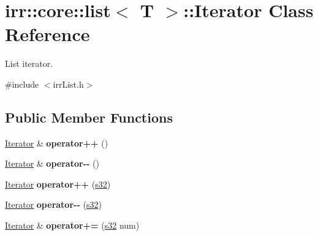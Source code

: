 \hypertarget{classirr_1_1core_1_1list_1_1Iterator}{}\section{irr\+:\+:core\+:\+:list$<$ T $>$\+:\+:Iterator Class Reference}
\label{classirr_1_1core_1_1list_1_1Iterator}


List iterator.  




{\ttfamily \#include $<$irr\+List.\+h$>$}

\subsection*{Public Member Functions}
\begin{DoxyCompactItemize}
\item 
\hyperlink{classirr_1_1core_1_1list_1_1Iterator}{Iterator} \& {\bfseries operator++} ()\hypertarget{classirr_1_1core_1_1list_1_1Iterator_a3d9a0e89be1ca80a0e4ca6321723ca46}{}\label{classirr_1_1core_1_1list_1_1Iterator_a3d9a0e89be1ca80a0e4ca6321723ca46}

\item 
\hyperlink{classirr_1_1core_1_1list_1_1Iterator}{Iterator} \& {\bfseries operator-\/-\/} ()\hypertarget{classirr_1_1core_1_1list_1_1Iterator_a8faef85eda196959b528c3879ff04ba2}{}\label{classirr_1_1core_1_1list_1_1Iterator_a8faef85eda196959b528c3879ff04ba2}

\item 
\hyperlink{classirr_1_1core_1_1list_1_1Iterator}{Iterator} {\bfseries operator++} (\hyperlink{namespaceirr_ac66849b7a6ed16e30ebede579f9b47c6}{s32})\hypertarget{classirr_1_1core_1_1list_1_1Iterator_a9313eb2751b512cb35baf01edcd83cc9}{}\label{classirr_1_1core_1_1list_1_1Iterator_a9313eb2751b512cb35baf01edcd83cc9}

\item 
\hyperlink{classirr_1_1core_1_1list_1_1Iterator}{Iterator} {\bfseries operator-\/-\/} (\hyperlink{namespaceirr_ac66849b7a6ed16e30ebede579f9b47c6}{s32})\hypertarget{classirr_1_1core_1_1list_1_1Iterator_a34ed22dcfb28ab5313dd82557c7d06e4}{}\label{classirr_1_1core_1_1list_1_1Iterator_a34ed22dcfb28ab5313dd82557c7d06e4}

\item 
\hyperlink{classirr_1_1core_1_1list_1_1Iterator}{Iterator} \& {\bfseries operator+=} (\hyperlink{namespaceirr_ac66849b7a6ed16e30ebede579f9b47c6}{s32} num)\hypertarget{classirr_1_1core_1_1list_1_1Iterator_a1c96267d7500c946e35230032a87689f}{}\label{classirr_1_1core_1_1list_1_1Iterator_a1c96267d7500c946e35230032a87689f}


\end{DoxyCompactItemize}
